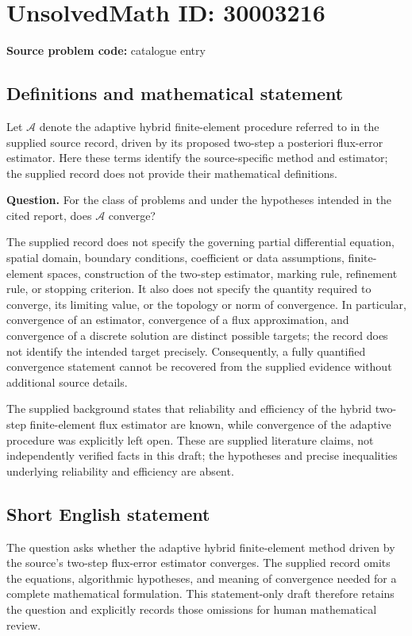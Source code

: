 \documentclass[11pt]{article}
\begin{document}
\section*{UnsolvedMath ID: 30003216}
\textbf{Source problem code:} catalogue entry
\subsection{Definitions and mathematical statement}
Let \(\mathcal A\) denote the adaptive hybrid finite-element procedure referred to in the supplied source record, driven by its proposed two-step a posteriori flux-error estimator. Here these terms identify the source-specific method and estimator; the supplied record does not provide their mathematical definitions.

\textbf{Question.} For the class of problems and under the hypotheses intended in the cited report, does \(\mathcal A\) converge?

The supplied record does not specify the governing partial differential equation, spatial domain, boundary conditions, coefficient or data assumptions, finite-element spaces, construction of the two-step estimator, marking rule, refinement rule, or stopping criterion. It also does not specify the quantity required to converge, its limiting value, or the topology or norm of convergence. In particular, convergence of an estimator, convergence of a flux approximation, and convergence of a discrete solution are distinct possible targets; the record does not identify the intended target precisely. Consequently, a fully quantified convergence statement cannot be recovered from the supplied evidence without additional source details.

The supplied background states that reliability and efficiency of the hybrid two-step finite-element flux estimator are known, while convergence of the adaptive procedure was explicitly left open. These are supplied literature claims, not independently verified facts in this draft; the hypotheses and precise inequalities underlying reliability and efficiency are absent.
\subsection{Short English statement}
The question asks whether the adaptive hybrid finite-element method driven by the source's two-step flux-error estimator converges. The supplied record omits the equations, algorithmic hypotheses, and meaning of convergence needed for a complete mathematical formulation. This statement-only draft therefore retains the question and explicitly records those omissions for human mathematical review.
\end{document}

